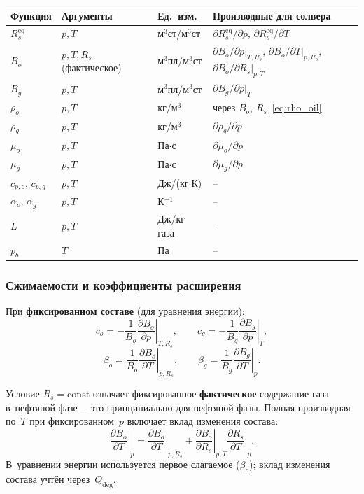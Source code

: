 \documentclass[12pt,a4paper]{article}
\newcommand{\pb}{p_b}
\newcommand{\Qdeg}{Q_{\mathrm{deg}}}
\begin{document}
\begin{center}
\begin{tabular}{llll}
\toprule
Функция & Аргументы & Ед.~изм. & Производные для солвера \\
\midrule
$R_s^{\text{eq}}$ & $p, T$ & м$^3$ст/м$^3$ст
  & $\partial R_s^{\text{eq}}/\partial p$, $\partial R_s^{\text{eq}}/\partial T$ \\
$B_o$     & $p, T, R_s$ (фактическое) & м$^3$пл/м$^3$ст
  & $\partial B_o/\partial p|_{T,R_s}$,
    $\partial B_o/\partial T|_{p,R_s}$,
    $\partial B_o/\partial R_s|_{p,T}$ \\
$B_g$     & $p, T$ & м$^3$пл/м$^3$ст
  & $\partial B_g/\partial p|_T$ \\
$\rho_o$  & $p, T$ & кг/м$^3$
  & через $B_o$, $R_s$~\eqref{eq:rho_oil} \\
$\rho_g$  & $p, T$ & кг/м$^3$
  & $\partial\rho_g/\partial p$ \\
$\mu_o$   & $p, T$ & Па$\cdot$с
  & $\partial\mu_o/\partial p$ \\
$\mu_g$   & $p, T$ & Па$\cdot$с
  & $\partial\mu_g/\partial p$ \\
$c_{p,o}$, $c_{p,g}$ & $p, T$ & Дж/(кг$\cdot$К)
  & --\\
$\alpha_o$, $\alpha_g$ & $p, T$ & К$^{-1}$
  & --\\
$L$       & $p, T$ & Дж/кг газа
  & --\\
$\pb$     & $T$ & Па
  & --\\
\bottomrule
\end{tabular}
\end{center}


\subsubsection{Сжимаемости и коэффициенты расширения}

При \textbf{фиксированном составе} (для уравнения энергии):
\begin{equation}\label{eq:co_cg}
  c_o = -\frac{1}{B_o}\left.\frac{\partial B_o}{\partial p}\right|_{T,R_s},
  \qquad
  c_g = -\frac{1}{B_g}\left.\frac{\partial B_g}{\partial p}\right|_T,
\end{equation}
\begin{equation}\label{eq:beta_o_g}
  \beta_o = \frac{1}{B_o}\left.\frac{\partial B_o}{\partial T}\right|_{p,R_s},
  \qquad
  \beta_g = \frac{1}{B_g}\left.\frac{\partial B_g}{\partial T}\right|_p.
\end{equation}

Условие $R_s = \mathrm{const}$ означает фиксированное
\textbf{фактическое} содержание газа в~нефтяной фазе~-- это
принципиально для нефтяной фазы.
Полная производная по~$T$ при фиксированном~$p$ включает вклад
изменения состава:
\begin{equation}\label{eq:beta_o_full}
  \left.\frac{\partial B_o}{\partial T}\right|_p
  = \left.\frac{\partial B_o}{\partial T}\right|_{p,R_s}
    + \left.\frac{\partial B_o}{\partial R_s}\right|_{p,T}
      \left.\frac{\partial R_s}{\partial T}\right|_p.
\end{equation}
В~уравнении энергии используется первое слагаемое ($\beta_o$);
вклад изменения состава учтён через~$\Qdeg$.
\end{document}
